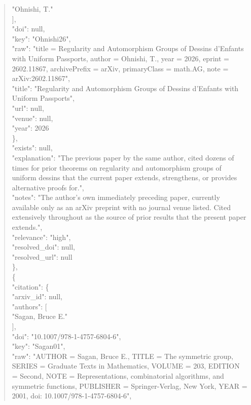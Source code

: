 \documentclass[11pt]{article}
\begin{document}
\begin{quote}
          "Ohnishi, T."\\
        ],\\
        "doi": null,\\
        "key": "Ohnishi26",\\
        "raw": "title = Regularity and Automorphism Groups of Dessins d'Enfants with Uniform Passports, author = Ohnishi, T., year = 2026, eprint = 2602.11867, archivePrefix = arXiv, primaryClass = math.AG, note = arXiv:2602.11867",\\
        "title": "Regularity and Automorphism Groups of Dessins d'Enfants with Uniform Passports",\\
        "url": null,\\
        "venue": null,\\
        "year": 2026\\
      \},\\
      "exists": null,\\
      "explanation": "The previous paper by the same author, cited dozens of times for prior theorems on regularity and automorphism groups of uniform dessins that the current paper extends, strengthens, or provides alternative proofs for.",\\
      "notes": "The author's own immediately preceding paper, currently available only as an arXiv preprint with no journal venue listed. Cited extensively throughout as the source of prior results that the present paper extends.",\\
      "relevance": "high",\\
      "resolved\_doi": null,\\
      "resolved\_url": null\\
    \},\\
    \{\\
      "citation": \{\\
        "arxiv\_id": null,\\
        "authors": [\\
          "Sagan, Bruce E."\\
        ],\\
        "doi": "10.1007/978-1-4757-6804-6",\\
        "key": "Sagan01",\\
        "raw": "AUTHOR = Sagan, Bruce E., TITLE = The symmetric group, SERIES = Graduate Texts in Mathematics, VOLUME = 203, EDITION = Second, NOTE = Representations, combinatorial algorithms, and symmetric functions, PUBLISHER = Springer-Verlag, New York, YEAR = 2001, doi: 10.1007/978-1-4757-6804-6",\\

\end{quote}
\end{document}
